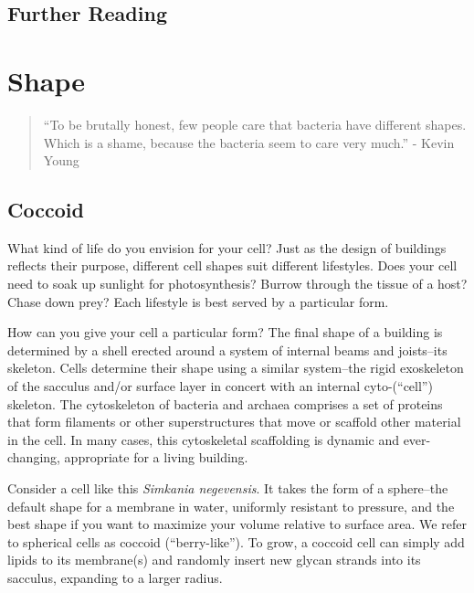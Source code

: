 \documentclass[]{tufte-book}
\begin{document}
\section{Further Reading}\label{further-reading-1}

\citep{errington2013}

\citep{ptacin2013}

\citep{sleytr1999}

\citep{strahl2017}

\chapter{Shape}\label{shape}

\begin{quote}
``To be brutally honest, few people care that bacteria have different
shapes. Which is a shame, because the bacteria seem to care very much.''
- Kevin Young \citep{young2006}
\end{quote}

\section{Coccoid}\label{coccoid}

What kind of life do you envision for your cell? Just as the design of
buildings reflects their purpose, different cell shapes suit different
lifestyles. Does your cell need to soak up sunlight for photosynthesis?
Burrow through the tissue of a host? Chase down prey? Each lifestyle is
best served by a particular form.

How can you give your cell a particular form? The final shape of a
building is determined by a shell erected around a system of internal
beams and joists--its skeleton. Cells determine their shape using a
similar system--the rigid exoskeleton of the sacculus and/or surface
layer in concert with an internal cyto-(``cell'') skeleton. The
cytoskeleton of bacteria and archaea comprises a set of proteins that
form filaments or other superstructures that move or scaffold other
material in the cell. In many cases, this cytoskeletal scaffolding is
dynamic and ever-changing, appropriate for a living building.

Consider a cell like this \emph{Simkania negevensis}. It takes the form
of a sphere--the default shape for a membrane in water, uniformly
resistant to pressure, and the best shape if you want to maximize your
volume relative to surface area. We refer to spherical cells as coccoid
(``berry-like''). To grow, a coccoid cell can simply add lipids to its
membrane(s) and randomly insert new glycan strands into its sacculus,
expanding to a larger radius.
\end{document}
